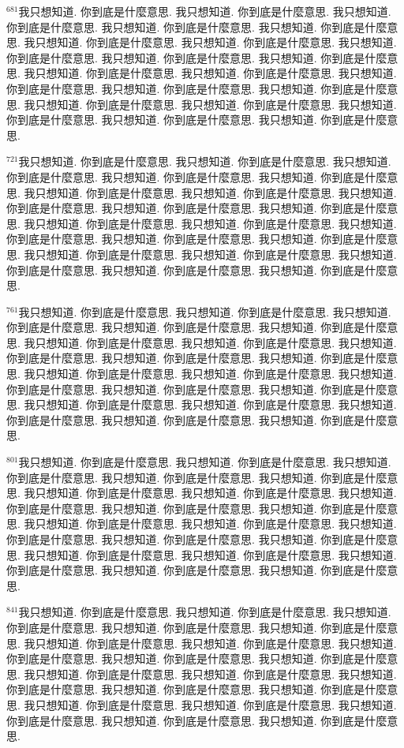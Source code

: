 \documentclass{book}
\begin{document}
$^{681}$我只想知道.
你到底是什麼意思.
我只想知道.
你到底是什麼意思.
我只想知道.
你到底是什麼意思.
我只想知道.
你到底是什麼意思.
我只想知道.
你到底是什麼意思.
我只想知道.
你到底是什麼意思.
我只想知道.
你到底是什麼意思.
我只想知道.
你到底是什麼意思.
我只想知道.
你到底是什麼意思.
我只想知道.
你到底是什麼意思.
我只想知道.
你到底是什麼意思.
我只想知道.
你到底是什麼意思.
我只想知道.
你到底是什麼意思.
我只想知道.
你到底是什麼意思.
我只想知道.
你到底是什麼意思.
我只想知道.
你到底是什麼意思.
我只想知道.
你到底是什麼意思.
我只想知道.
你到底是什麼意思.
我只想知道.
你到底是什麼意思.
我只想知道.
你到底是什麼意思.

$^{721}$我只想知道.
你到底是什麼意思.
我只想知道.
你到底是什麼意思.
我只想知道.
你到底是什麼意思.
我只想知道.
你到底是什麼意思.
我只想知道.
你到底是什麼意思.
我只想知道.
你到底是什麼意思.
我只想知道.
你到底是什麼意思.
我只想知道.
你到底是什麼意思.
我只想知道.
你到底是什麼意思.
我只想知道.
你到底是什麼意思.
我只想知道.
你到底是什麼意思.
我只想知道.
你到底是什麼意思.
我只想知道.
你到底是什麼意思.
我只想知道.
你到底是什麼意思.
我只想知道.
你到底是什麼意思.
我只想知道.
你到底是什麼意思.
我只想知道.
你到底是什麼意思.
我只想知道.
你到底是什麼意思.
我只想知道.
你到底是什麼意思.
我只想知道.
你到底是什麼意思.

$^{761}$我只想知道.
你到底是什麼意思.
我只想知道.
你到底是什麼意思.
我只想知道.
你到底是什麼意思.
我只想知道.
你到底是什麼意思.
我只想知道.
你到底是什麼意思.
我只想知道.
你到底是什麼意思.
我只想知道.
你到底是什麼意思.
我只想知道.
你到底是什麼意思.
我只想知道.
你到底是什麼意思.
我只想知道.
你到底是什麼意思.
我只想知道.
你到底是什麼意思.
我只想知道.
你到底是什麼意思.
我只想知道.
你到底是什麼意思.
我只想知道.
你到底是什麼意思.
我只想知道.
你到底是什麼意思.
我只想知道.
你到底是什麼意思.
我只想知道.
你到底是什麼意思.
我只想知道.
你到底是什麼意思.
我只想知道.
你到底是什麼意思.
我只想知道.
你到底是什麼意思.

$^{801}$我只想知道.
你到底是什麼意思.
我只想知道.
你到底是什麼意思.
我只想知道.
你到底是什麼意思.
我只想知道.
你到底是什麼意思.
我只想知道.
你到底是什麼意思.
我只想知道.
你到底是什麼意思.
我只想知道.
你到底是什麼意思.
我只想知道.
你到底是什麼意思.
我只想知道.
你到底是什麼意思.
我只想知道.
你到底是什麼意思.
我只想知道.
你到底是什麼意思.
我只想知道.
你到底是什麼意思.
我只想知道.
你到底是什麼意思.
我只想知道.
你到底是什麼意思.
我只想知道.
你到底是什麼意思.
我只想知道.
你到底是什麼意思.
我只想知道.
你到底是什麼意思.
我只想知道.
你到底是什麼意思.
我只想知道.
你到底是什麼意思.
我只想知道.
你到底是什麼意思.

$^{841}$我只想知道.
你到底是什麼意思.
我只想知道.
你到底是什麼意思.
我只想知道.
你到底是什麼意思.
我只想知道.
你到底是什麼意思.
我只想知道.
你到底是什麼意思.
我只想知道.
你到底是什麼意思.
我只想知道.
你到底是什麼意思.
我只想知道.
你到底是什麼意思.
我只想知道.
你到底是什麼意思.
我只想知道.
你到底是什麼意思.
我只想知道.
你到底是什麼意思.
我只想知道.
你到底是什麼意思.
我只想知道.
你到底是什麼意思.
我只想知道.
你到底是什麼意思.
我只想知道.
你到底是什麼意思.
我只想知道.
你到底是什麼意思.
我只想知道.
你到底是什麼意思.
我只想知道.
你到底是什麼意思.
我只想知道.
你到底是什麼意思.
我只想知道.
你到底是什麼意思.
\end{document}

